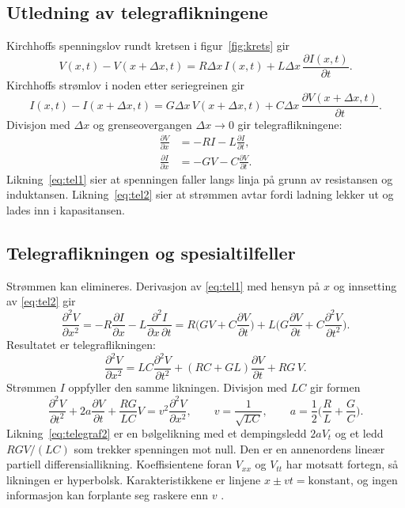 \documentclass[11pt,a4paper]{article}
\numberwithin{equation}{section}
\numberwithin{figure}{section}
\numberwithin{table}{section}
\newcommand{\pd}[2]{\frac{\partial #1}{\partial #2}}
\newcommand{\pdd}[2]{\frac{\partial^2 #1}{\partial #2^2}}
\begin{document}
\subsection{Utledning av telegraflikningene}
Kirchhoffs spenningslov rundt kretsen i figur~\ref{fig:krets} gir
\begin{equation}
  V(x,t) - V(x+\Delta x,t) = R\Delta x\, I(x,t) + L\Delta x\, \pd{I(x,t)}{t}.
\end{equation}
Kirchhoffs strømlov i noden etter seriegreinen gir
\begin{equation}
  I(x,t) - I(x+\Delta x,t) = G\Delta x\, V(x+\Delta x,t) + C\Delta x\, \pd{V(x+\Delta x,t)}{t}.
\end{equation}
Divisjon med $\Delta x$ og grenseovergangen $\Delta x \to 0$ gir
telegraflikningene:
\begin{align}
  \pd{V}{x} &= -RI - L\pd{I}{t}, \label{eq:tel1}\\
  \pd{I}{x} &= -GV - C\pd{V}{t}. \label{eq:tel2}
\end{align}
Likning~\eqref{eq:tel1} sier at spenningen faller langs linja på grunn av
resistansen og induktansen. Likning~\eqref{eq:tel2} sier at strømmen avtar fordi
ladning lekker ut og lades inn i kapasitansen.

\subsection{Telegraflikningen og spesialtilfeller}
Strømmen kan elimineres. Derivasjon av \eqref{eq:tel1} med hensyn på $x$ og
innsetting av \eqref{eq:tel2} gir
\begin{equation*}
  \pdd{V}{x} = -R\pd{I}{x} - L\frac{\partial^2 I}{\partial x\,\partial t}
  = R\Big(GV + C\pd{V}{t}\Big) + L\Big(G\pd{V}{t} + C\pdd{V}{t}\Big).
\end{equation*}
Resultatet er telegraflikningen:
\begin{equation}
  \pdd{V}{x} = LC\pdd{V}{t} + (RC + GL)\pd{V}{t} + RG\,V. \label{eq:telegraf}
\end{equation}
Strømmen $I$ oppfyller den samme likningen. Divisjon med $LC$ gir formen
\begin{equation}
  \pdd{V}{t} + 2a\pd{V}{t} + \frac{RG}{LC}V = v^2\pdd{V}{x},
  \qquad v = \frac{1}{\sqrt{LC}}, \qquad a = \frac12\Big(\frac{R}{L} + \frac{G}{C}\Big).
  \label{eq:telegraf2}
\end{equation}
Likning~\eqref{eq:telegraf2} er en bølgelikning med et dempingsledd $2aV_t$ og et
ledd $RGV/(LC)$ som trekker spenningen mot null. Den er en annenordens lineær
partiell differensiallikning. Koeffisientene foran $V_{xx}$ og $V_{tt}$ har
motsatt fortegn, så likningen er hyperbolsk. Karakteristikkene er linjene
$x \pm vt = \text{konstant}$, og ingen informasjon kan forplante seg raskere
enn $v$ \cite{strauss2008}.
\end{document}
